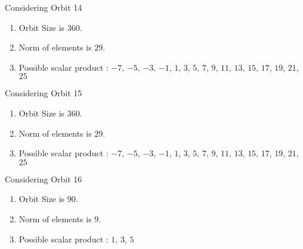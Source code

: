 \documentclass[12pt]{article}
\begin{document}
Considering Orbit 14
\begin{enumerate}
\item Orbit Size is $360$.
\item Norm of elements is $29$.
\item Possible scalar product : $-7$, $-5$, $-3$, $-1$, $1$, $3$, $5$, $7$, $9$, $11$, $13$, $15$, $17$, $19$, $21$, $25$
\end{enumerate}
Considering Orbit 15
\begin{enumerate}
\item Orbit Size is $360$.
\item Norm of elements is $29$.
\item Possible scalar product : $-7$, $-5$, $-3$, $-1$, $1$, $3$, $5$, $7$, $9$, $11$, $13$, $15$, $17$, $19$, $21$, $25$
\end{enumerate}
Considering Orbit 16
\begin{enumerate}
\item Orbit Size is $90$.
\item Norm of elements is $9$.
\item Possible scalar product : $1$, $3$, $5$
\end{enumerate}
\end{document}
